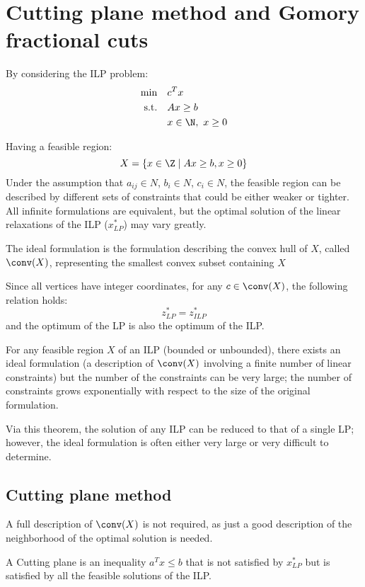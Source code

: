 \section{Cutting plane method and Gomory fractional cuts}

By considering the ILP problem:
\begin{gather*}
    \begin{aligned}
    \min \quad        & c^T x                \\
    \text{s.t.} \quad & Ax \geq b            \\
                        & x \in \N, \ x \geq 0
    \end{aligned}
\end{gather*}

Having a feasible region:
\[ X = \left\{ x \in \Z \mid Ax \geq b,x \geq 0 \right\} \]
Under the assumption that $a_{ij} \in N$, $b_i \in N$, $c_i \in N$, the feasible region can be described by different sets of constraints that could be either weaker or tighter.
All infinite formulations are equivalent, but the optimal solution of the linear relaxations of the ILP ($x^\ast_{LP}$) may vary greatly.
\begin{definition}
    The ideal formulation is the formulation describing the convex hull of $X$, called $\conv(X)$, representing the smallest convex subset containing $X$
\end{definition}
Since all vertices have integer coordinates, for any $c \in \conv(X)$, the following relation holds:
\[ z^\ast_{LP} = z^\ast_{ILP} \]
and the optimum of the LP is also the optimum of the ILP.

\begin{theorem}
    For any feasible region $X$ of an ILP (bounded or unbounded), there exists an ideal formulation (a description of $\conv(X)$ involving a finite number of linear constraints) but the number of the constraints can be very large;
    the number of constraints grows exponentially with respect to the size of the original formulation.
\end{theorem}
Via this theorem, the solution of any ILP can be reduced to that of a single LP;
however, the ideal formulation is often either very large or very difficult to determine.

\subsection{Cutting plane method}
A full description of $\conv(X)$ is not required, as just a good description of the neighborhood of the optimal solution is needed.
\begin{definition}
    A Cutting plane is an inequality $a^T x \leq b$ that is not satisfied by $x^\ast_{LP}$ but is satisfied by all the feasible solutions of the ILP.
\end{definition}


